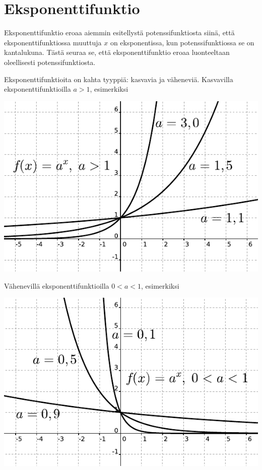\chapter{Eksponenttifunktio}


Eksponenttifunktio eroaa aiemmin esitellystä potenssifunktiosta siinä, että
eksponenttifunktiossa muuttuja $x$ on eksponentissa, kun potenssifunktiossa
se on kantalukuna. Tästä seuraa se, että eksponenttifunktio eroaa luonteeltaan
oleellisesti potenssifunktiosta.

Eksponenttifunktioita on kahta tyyppiä: kasvavia ja väheneviä.
Kasvavilla eksponenttifunktioilla $a>1$, esimerkiksi

\begin{center}
\includegraphics{03-funktiot/kuvia/apotenssiinxaisompikuinyksi.pdf}
\end{center}

Vähenevillä eksponenttifunktioilla $0<a<1$, esimerkiksi

\begin{center}
\includegraphics{03-funktiot/kuvia/apotenssiinxaisompikuinnolla.pdf}
\end{center}

